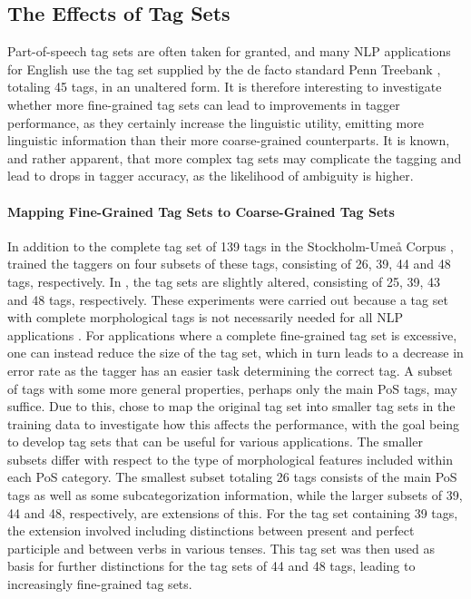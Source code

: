 \documentclass[a4paper,12pt,english]{book}
\begin{document}
\subsection{The Effects of Tag Sets}
\label{ssec:tagsets}
Part-of-speech tag sets are often taken for granted, and many NLP applications
for English use the tag set supplied by the de facto standard Penn Treebank
\cite{Mar:San:Mar:93}, totaling 45 tags, in an unaltered form. It is therefore
interesting to investigate whether more fine-grained tag sets can lead to
improvements in tagger performance, as they certainly increase the linguistic
utility, emitting more linguistic information than their more coarse-grained
counterparts. It is known, and rather apparent, that more complex tag sets may
complicate the tagging and lead to drops in tagger accuracy, as the likelihood
of ambiguity is higher.

\paragraph{Mapping Fine-Grained Tag Sets to Coarse-Grained Tag Sets} In
addition to the complete tag set of 139 tags in the Stockholm-Umeå Corpus
\cite{Gus:Har:06},  trained the taggers on four subsets of these
tags, consisting of 26, 39, 44 and 48 tags, respectively. In ,
the tag sets are slightly altered, consisting of 25, 39, 43 and 48 tags,
respectively. These experiments were carried out because a tag set with
complete morphological tags is not necessarily needed for all NLP applications
\cite{Meg:02}. For applications where a complete fine-grained tag set is
excessive, one can instead reduce the size of the tag set, which in turn leads
to a decrease in error rate as the tagger has an easier task determining the
correct tag. A subset of tags with some more general properties, perhaps only
the main PoS tags, may suffice. Due to this,  chose to map the
original tag set into smaller tag sets in the training data to investigate how
this affects the performance, with the goal being to develop tag sets that can
be useful for various applications. The smaller subsets differ with respect to
the type of morphological features included within each PoS category. The
smallest subset totaling 26 tags consists of the main PoS tags as well as some
subcategorization information, while the larger subsets of 39, 44 and 48,
respectively, are extensions of this. For the tag set containing 39 tags, the
extension involved including distinctions between present and perfect
participle and between verbs in various tenses. This tag set was then used as
basis for further distinctions for the tag sets of 44 and 48 tags, leading to
increasingly fine-grained tag sets.
\end{document}
